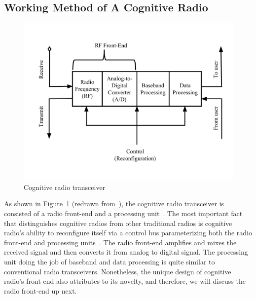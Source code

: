 \subsection{Working Method of A Cognitive Radio}

\begin{figure}[!htbp]
\vspace{-1cm}
\begin{center}
    \includegraphics[scale=0.5]{myFigures/PhysicalCR}
\vspace{-1cm}
    \caption{Cognitive radio transceiver}
    \label{fig:PhysicalCR}
\end{center}
\end{figure}

As shown in Figure~\ref{fig:PhysicalCR} (redrawn from~\cite{jondral2005software}), the cognitive radio transceiver is consisted of a radio front-end and a processing unit~\cite{akyildiz2006next}. The most important fact that distinguishes cognitive radios from other traditional radios is cognitive radio's ability to reconfigure itself via a control bus parameterizing both the radio front-end and processing units~\cite{jondral2005software}. The radio front-end amplifies and mixes the received signal and then converts it from analog to digital signal. The processing unit doing the job of baseband and data processing is quite similar to conventional radio transceivers. Nonetheless, the unique design of cognitive radio's front end also attributes to its novelty, and therefore, we will discuss the radio front-end up next.

